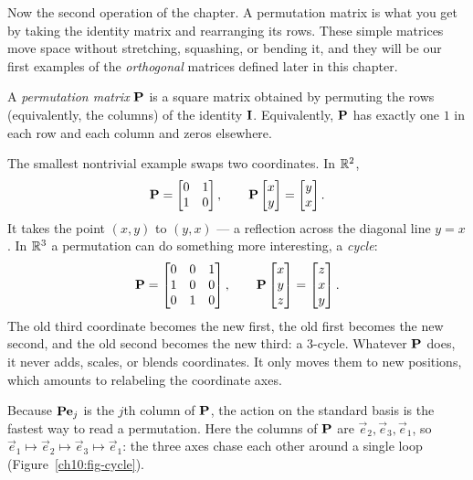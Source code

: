 Now the second operation of the chapter. A permutation matrix is what you get by taking the
identity matrix and rearranging its rows. These simple matrices move space without stretching,
squashing, or bending it, and they will be our first examples of the \emph{orthogonal} matrices
defined later in this chapter.

\begin{definition}\label{ch10:def-perm}
A \emph{permutation matrix} $\mathbf{P}$ is a square matrix obtained by permuting the rows (equivalently,
the columns) of the identity $\mathbf{I}$. Equivalently, $\mathbf{P}$ has exactly one $1$ in each row and
each column and zeros elsewhere.
\end{definition}

The smallest nontrivial example swaps two coordinates. In $\mathbb{R}^2$,
\[
  \mathbf{P}=\begin{bmatrix} 0 & 1 \\ 1 & 0 \end{bmatrix},
  \qquad
  \mathbf{P}\begin{bmatrix}x\\y\end{bmatrix}=\begin{bmatrix}y\\x\end{bmatrix}.
\]
It takes the point $(x,y)$ to $(y,x)$ --- a reflection across the diagonal line $y=x$. In $\mathbb{R}^3$ a
permutation can do something more interesting, a \emph{cycle}:
\[
  \mathbf{P}=\begin{bmatrix} 0 & 0 & 1 \\ 1 & 0 & 0 \\ 0 & 1 & 0 \end{bmatrix},
  \qquad
  \mathbf{P}\begin{bmatrix}x\\y\\z\end{bmatrix}=\begin{bmatrix}z\\x\\y\end{bmatrix}.
\]
The old third coordinate becomes the new first, the old first becomes the new second, and the old
second becomes the new third: a $3$-cycle. Whatever $\mathbf{P}$ does, it never adds,
scales, or blends coordinates. It only moves them to new positions, which amounts to relabeling
the coordinate axes.

Because $\mathbf{P}\mathbf{e}_j$ is the $j$th column of $\mathbf{P}$, the action on the standard basis is the
fastest way to read a permutation. Here the columns of $\mathbf{P}$ are $\vec{e}_2,\vec{e}_3,\vec{e}_1$,
so $\vec{e}_1\mapsto\vec{e}_2\mapsto\vec{e}_3\mapsto\vec{e}_1$: the three axes chase each other around
a single loop (Figure~\ref{ch10:fig-cycle}).

